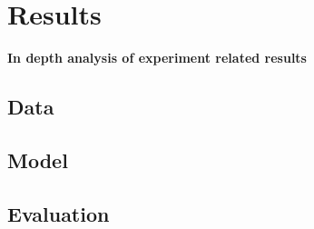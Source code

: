 \documentclass[journal]{IEEEtran}
\begin{document}

\section{Results}
\textbf{In depth analysis of experiment related results}

\subsection{Data}
\subsection{Model}
\subsection{Evaluation}

\end{document}
